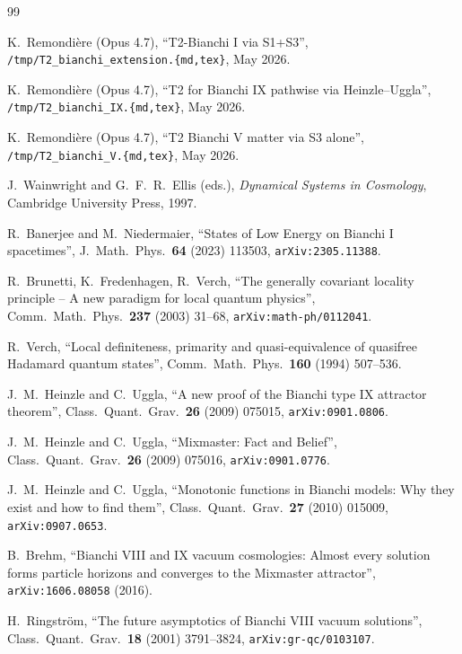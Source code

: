 \documentclass[11pt,a4paper]{article}
\theoremstyle{definition}
\begin{document}
\begin{thebibliography}{99}

 K.\ Remondi\`ere (Opus 4.7), ``T2-Bianchi I via S1+S3'',
\texttt{/tmp/T2\_bianchi\_extension.\{md,tex\}}, May 2026.

 K.\ Remondi\`ere (Opus 4.7), ``T2 for Bianchi IX pathwise
via Heinzle--Uggla'', \texttt{/tmp/T2\_bianchi\_IX.\{md,tex\}}, May 2026.

 K.\ Remondi\`ere (Opus 4.7), ``T2 Bianchi V matter via
S3 alone'', \texttt{/tmp/T2\_bianchi\_V.\{md,tex\}}, May 2026.

 J.\ Wainwright and G.~F.~R.\ Ellis (eds.),
\emph{Dynamical Systems in Cosmology}, Cambridge University Press, 1997.

 R.\ Banerjee and M.\ Niedermaier, ``States of Low Energy on
Bianchi I spacetimes'', J.\ Math.\ Phys.\ \textbf{64} (2023) 113503,
\texttt{arXiv:2305.11388}.

 R.\ Brunetti, K.\ Fredenhagen, R.\ Verch, ``The generally
covariant locality principle -- A new paradigm for local quantum physics'',
Comm.\ Math.\ Phys.\ \textbf{237} (2003) 31--68,
\texttt{arXiv:math-ph/0112041}.

 R.\ Verch, ``Local definiteness, primarity and
quasi-equivalence of quasifree Hadamard quantum states'',
Comm.\ Math.\ Phys.\ \textbf{160} (1994) 507--536.

 J.~M.\ Heinzle and C.\ Uggla, ``A new proof of the Bianchi
type IX attractor theorem'', Class.\ Quant.\ Grav.\ \textbf{26} (2009)
075015, \texttt{arXiv:0901.0806}.

 J.~M.\ Heinzle and C.\ Uggla, ``Mixmaster: Fact and Belief'',
Class.\ Quant.\ Grav.\ \textbf{26} (2009) 075016, \texttt{arXiv:0901.0776}.

 J.~M.\ Heinzle and C.\ Uggla, ``Monotonic functions in
Bianchi models: Why they exist and how to find them'',
Class.\ Quant.\ Grav.\ \textbf{27} (2010) 015009,
\texttt{arXiv:0907.0653}.

 B.\ Brehm, ``Bianchi VIII and IX vacuum cosmologies:
Almost every solution forms particle horizons and converges to the Mixmaster
attractor'', \texttt{arXiv:1606.08058} (2016).

 H.\ Ringstr\"om, ``The future asymptotics of Bianchi
VIII vacuum solutions'', Class.\ Quant.\ Grav.\ \textbf{18} (2001) 3791--3824,
\texttt{arXiv:gr-qc/0103107}.


\end{thebibliography}
\end{document}
